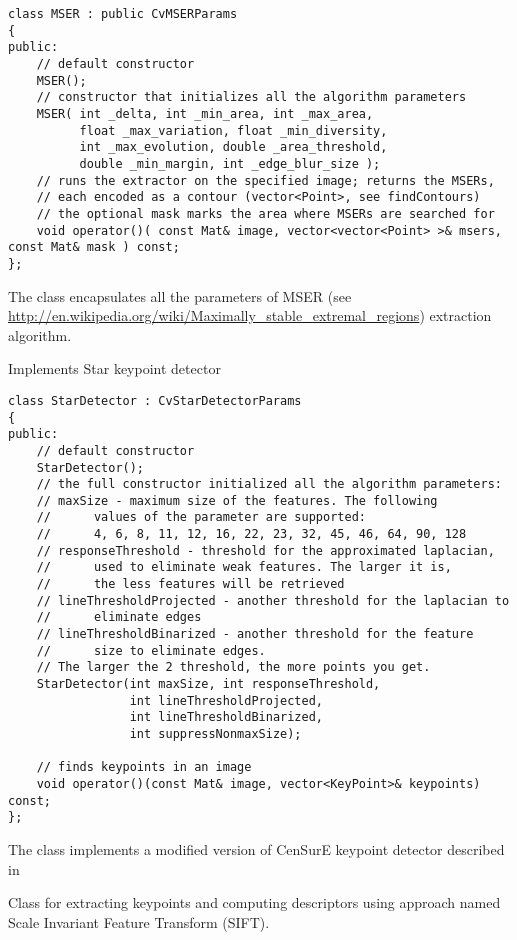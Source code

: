 \begin{lstlisting}
class MSER : public CvMSERParams
{
public:
    // default constructor
    MSER();
    // constructor that initializes all the algorithm parameters
    MSER( int _delta, int _min_area, int _max_area,
          float _max_variation, float _min_diversity,
          int _max_evolution, double _area_threshold,
          double _min_margin, int _edge_blur_size );
    // runs the extractor on the specified image; returns the MSERs,
    // each encoded as a contour (vector<Point>, see findContours)
    // the optional mask marks the area where MSERs are searched for
    void operator()( const Mat& image, vector<vector<Point> >& msers, const Mat& mask ) const;
};
\end{lstlisting}

The class encapsulates all the parameters of MSER (see \url{http://en.wikipedia.org/wiki/Maximally_stable_extremal_regions}) extraction algorithm. 

Implements Star keypoint detector

\begin{lstlisting}
class StarDetector : CvStarDetectorParams
{
public:
    // default constructor
    StarDetector();
    // the full constructor initialized all the algorithm parameters:
    // maxSize - maximum size of the features. The following 
    //      values of the parameter are supported:
    //      4, 6, 8, 11, 12, 16, 22, 23, 32, 45, 46, 64, 90, 128
    // responseThreshold - threshold for the approximated laplacian,
    //      used to eliminate weak features. The larger it is,
    //      the less features will be retrieved
    // lineThresholdProjected - another threshold for the laplacian to 
    //      eliminate edges
    // lineThresholdBinarized - another threshold for the feature 
    //      size to eliminate edges.
    // The larger the 2 threshold, the more points you get.
    StarDetector(int maxSize, int responseThreshold,
                 int lineThresholdProjected,
                 int lineThresholdBinarized,
                 int suppressNonmaxSize);

    // finds keypoints in an image
    void operator()(const Mat& image, vector<KeyPoint>& keypoints) const;
};
\end{lstlisting}

The class implements a modified version of CenSurE keypoint detector described in
\cite{Agrawal08}

Class for extracting keypoints and computing descriptors using approach named Scale Invariant Feature Transform (SIFT).

